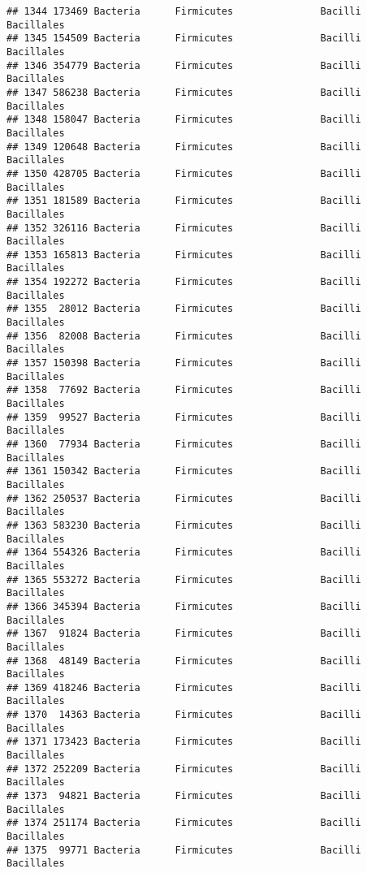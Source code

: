 \documentclass[
]{article}
\begin{document}
\begin{verbatim}
## 1344 173469 Bacteria      Firmicutes               Bacilli          Bacillales
## 1345 154509 Bacteria      Firmicutes               Bacilli          Bacillales
## 1346 354779 Bacteria      Firmicutes               Bacilli          Bacillales
## 1347 586238 Bacteria      Firmicutes               Bacilli          Bacillales
## 1348 158047 Bacteria      Firmicutes               Bacilli          Bacillales
## 1349 120648 Bacteria      Firmicutes               Bacilli          Bacillales
## 1350 428705 Bacteria      Firmicutes               Bacilli          Bacillales
## 1351 181589 Bacteria      Firmicutes               Bacilli          Bacillales
## 1352 326116 Bacteria      Firmicutes               Bacilli          Bacillales
## 1353 165813 Bacteria      Firmicutes               Bacilli          Bacillales
## 1354 192272 Bacteria      Firmicutes               Bacilli          Bacillales
## 1355  28012 Bacteria      Firmicutes               Bacilli          Bacillales
## 1356  82008 Bacteria      Firmicutes               Bacilli          Bacillales
## 1357 150398 Bacteria      Firmicutes               Bacilli          Bacillales
## 1358  77692 Bacteria      Firmicutes               Bacilli          Bacillales
## 1359  99527 Bacteria      Firmicutes               Bacilli          Bacillales
## 1360  77934 Bacteria      Firmicutes               Bacilli          Bacillales
## 1361 150342 Bacteria      Firmicutes               Bacilli          Bacillales
## 1362 250537 Bacteria      Firmicutes               Bacilli          Bacillales
## 1363 583230 Bacteria      Firmicutes               Bacilli          Bacillales
## 1364 554326 Bacteria      Firmicutes               Bacilli          Bacillales
## 1365 553272 Bacteria      Firmicutes               Bacilli          Bacillales
## 1366 345394 Bacteria      Firmicutes               Bacilli          Bacillales
## 1367  91824 Bacteria      Firmicutes               Bacilli          Bacillales
## 1368  48149 Bacteria      Firmicutes               Bacilli          Bacillales
## 1369 418246 Bacteria      Firmicutes               Bacilli          Bacillales
## 1370  14363 Bacteria      Firmicutes               Bacilli          Bacillales
## 1371 173423 Bacteria      Firmicutes               Bacilli          Bacillales
## 1372 252209 Bacteria      Firmicutes               Bacilli          Bacillales
## 1373  94821 Bacteria      Firmicutes               Bacilli          Bacillales
## 1374 251174 Bacteria      Firmicutes               Bacilli          Bacillales
## 1375  99771 Bacteria      Firmicutes               Bacilli          Bacillales

\end{verbatim}
\end{document}
